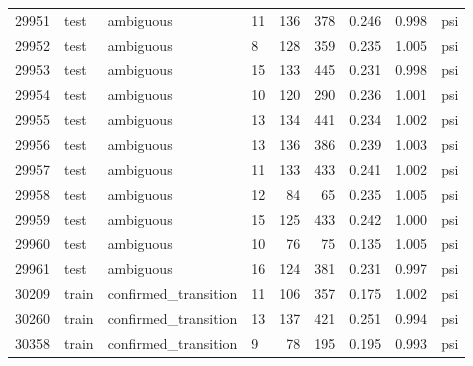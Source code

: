 \begin{longtable}{rlllrrrrl}
29951 & test & ambiguous & 11 & 136 & 378 & 0.246 & 0.998 & psi \\
29952 & test & ambiguous & 8 & 128 & 359 & 0.235 & 1.005 & psi \\
29953 & test & ambiguous & 15 & 133 & 445 & 0.231 & 0.998 & psi \\
29954 & test & ambiguous & 10 & 120 & 290 & 0.236 & 1.001 & psi \\
29955 & test & ambiguous & 13 & 134 & 441 & 0.234 & 1.002 & psi \\
29956 & test & ambiguous & 13 & 136 & 386 & 0.239 & 1.003 & psi \\
29957 & test & ambiguous & 11 & 133 & 433 & 0.241 & 1.002 & psi \\
29958 & test & ambiguous & 12 & 84 & 65 & 0.235 & 1.005 & psi \\
29959 & test & ambiguous & 15 & 125 & 433 & 0.242 & 1.000 & psi \\
29960 & test & ambiguous & 10 & 76 & 75 & 0.135 & 1.005 & psi \\
29961 & test & ambiguous & 16 & 124 & 381 & 0.231 & 0.997 & psi \\
30209 & train & confirmed\_transition & 11 & 106 & 357 & 0.175 & 1.002 & psi \\
30260 & train & confirmed\_transition & 13 & 137 & 421 & 0.251 & 0.994 & psi \\
30358 & train & confirmed\_transition & 9 & 78 & 195 & 0.195 & 0.993 & psi \\
\bottomrule
\end{longtable}